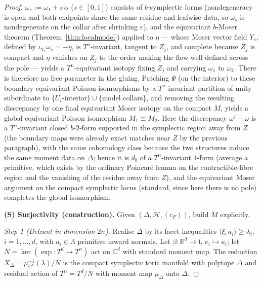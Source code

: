 \documentclass{amsart}
\theoremstyle{definition}
\begin{document}
\begin{proof}
$\omega_s:=\omega_1+s\,\alpha$ ($s\in[0,1]$) consists of $b$-symplectic forms
(nondegeneracy is open and both endpoints share the same residue and leafwise
data, so $\omega_s$ is nondegenerate on the collar after shrinking
$\varepsilon$), and the equivariant $b$-Moser theorem
(Theorem~\ref{thm:localmodel}) applied to $\eta$ — whose Moser vector field
$Y_s$, defined by $\iota_{Y_s}\omega_s=-\eta$, is $T^n$-invariant, tangent to
$Z_j$, and complete because $Z_j$ is compact and $\eta$ vanishes on $Z_j$ to the
order making the flow well-defined across the pole — yields a $T^n$-equivariant
isotopy fixing $Z_j$ and carrying $\omega_1$ to $\omega_2$. There is therefore no
free parameter in the gluing. Patching $\Psi$ (on the interior) to these
boundary equivariant Poisson isomorphisms by a $T^n$-invariant partition of
unity subordinate to $\{U_i$-interior$\}\cup\{$model collars$\}$, and removing
the resulting discrepancy by one final equivariant Moser isotopy on the compact
$M$, yields a global equivariant Poisson isomorphism $M_1\cong M_2$. Here the
discrepancy $\omega'-\omega$ is a $T^n$-invariant closed $b$-$2$-form supported
in the symplectic region away from $Z$ (the boundary maps were already exact
matches near $Z$ by the previous paragraph), with the same cohomology class
because the two structures induce the same moment data on $\Delta$; hence it is
$d_b$ of a $T^n$-invariant $1$-form (average a primitive, which exists by the
ordinary Poincar\'e lemma on the contractible-fibre region and the vanishing of
the residue away from $Z$), and the equivariant Moser argument on the compact
symplectic locus (standard, since here there is no pole) completes the global
isomorphism.

\medskip
\noindent\textbf{(S) Surjectivity (construction).}
Given $(\Delta,\mathcal H,(c_F))$, build $M$ explicitly.

\emph{Step 1 (Delzant in dimension $2n$).} Realise $\Delta$ by its facet
inequalities $\langle\xi,a_i\rangle\ge\lambda_i$, $i=1,\dots,d$, with
$a_i\in\Lambda$ primitive inward normals. Let $\beta\colon\mathbb R^d\to
\mathfrak t$, $e_i\mapsto a_i$; let $N=\ker(\exp\colon T^d\to T^n)$ act on
$\mathbb C^d$ with standard moment map. The reduction
$X_\Delta=\mu_{\mathbb C^d}^{-1}(\lambda)/N$ is the compact symplectic toric
manifold with polytope $\Delta$ and residual action of $T^n=T^d/N$ with moment
map $\mu_\Delta$ onto $\Delta$.


\end{proof}
\end{document}
